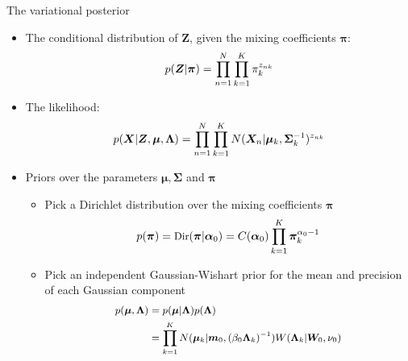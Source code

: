 \documentclass[10pt,mathserif]{beamer}
\begin{document}
\begin{frame}{The variational posterior}
\begin{itemize}
    \item The conditional distribution of $\bm{Z}$, given the mixing coefficients $\bm{\pi}$:
    \begin{equation}\small\label{eq:21}
        p(\bm{Z}|\bm{\pi}) = \prod_{n=1}^N \prod_{k=1}^K \pi_k^{z_{nk}}
    \end{equation}
    \item The likelihood:
    \begin{equation}\small\label{eq:22}
        p(\bm{X}|\bm{Z},\bm{\mu}, \bm{\bm{\Lambda}}) = \prod_{n=1}^N \prod_{k=1}^K N(\bm{X}_n|\bm{\mu}_k,\bm{\Sigma}_k^{-1})^{z_{nk}}
    \end{equation}
    \item Priors over the parameters $\bm{\mu}, \bm{\Sigma}$ and $\bm{\pi}$
    \begin{itemize}
        \item Pick a Dirichlet distribution over the mixing coefficients $\bm{\pi}$
    \begin{equation}\small
        p(\bm{\pi}) = \text{Dir}(\bm{\pi}|\bm{\alpha}_0) = C(\bm{\alpha}_0)\prod_{k=1}^K \bm{\pi}_k^{\alpha_0 - 1}
    \end{equation}
        \item Pick an independent Gaussian-Wishart prior for the mean and precision of each Gaussian component
    \begin{equation}\small
        \begin{split}
            p(\bm{\mu}, \bm{\Lambda}) & = p(\bm{\mu}|\bm{\Lambda})p(\bm{\Lambda})\\
            & = \prod_{k=1}^K N(\bm{\mu}_k|\bm{m}_0,(\beta_0\bm{\Lambda}_k)^{-1})W(\bm{\Lambda}_k|\bm{W}_0,\nu_0)
        \end{split}
    \end{equation}
    \end{itemize}
\end{itemize}
\end{frame}
\end{document}
